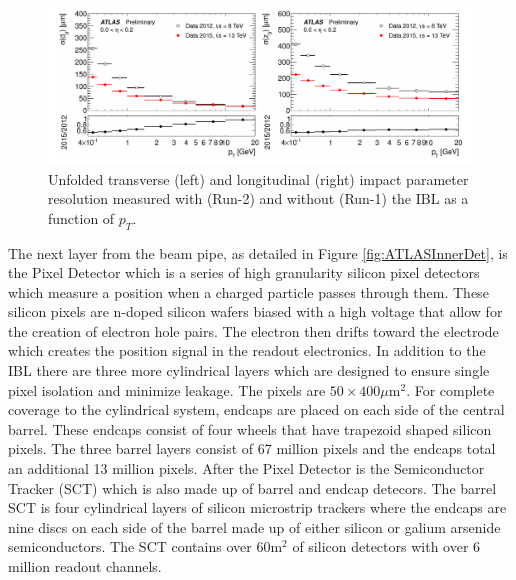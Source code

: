 \begin{figure}[ht!]
	\centering
	\includegraphics[width=\columnwidth]{../ThesisImages/LHCImages/tracking.png}
	\caption[Unfolded transverse (left) and longitudinal (right) impact parameter resolutions measured with (Run-2) and without (Run-1) the IBL as a function of $p_T$.]{Unfolded transverse (left) and longitudinal (right) impact parameter resolution measured with (Run-2) and without (Run-1) the IBL as a function of $p_T$\cite{Takubo:2017wvt}.
	}
	\label{fig:impParamIBL}
\end{figure}

The next layer from the beam pipe, as detailed in Figure \ref{fig:ATLASInnerDet}, is the Pixel Detector which is a series of high granularity silicon pixel detectors which measure a position when a charged particle passes through them.  These silicon pixels are n-doped silicon wafers biased with a high voltage that allow for the creation of electron hole pairs.  The electron then drifts toward the electrode which creates the position signal in the readout electronics.  In addition to the IBL there are three more cylindrical layers which are designed to ensure single pixel isolation and minimize leakage.  The pixels are $50 \times 400\mu\text{m}^2$.  For complete coverage to the cylindrical system, endcaps are placed on each side of the central barrel.  These endcaps consist of four wheels that have trapezoid shaped silicon pixels.  The three barrel layers consist of 67 million pixels and the endcaps total an additional 13 million pixels.
After the Pixel Detector is the Semiconductor Tracker (SCT) which is also made up of barrel and endcap detecors.  The barrel SCT is four cylindrical layers of silicon microstrip trackers where the endcaps are nine discs on each side of the barrel made up of either silicon or galium arsenide semiconductors.  The SCT contains over $60\text{m}^2$ of silicon detectors with over 6 million readout channels.

